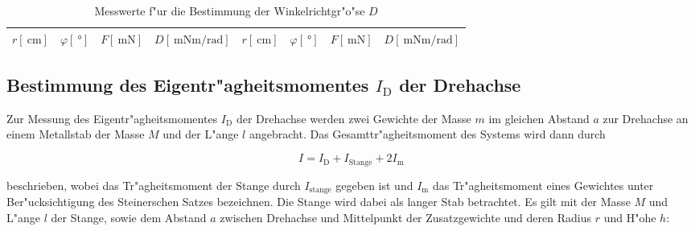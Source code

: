 
		\begin{table}[h!]
			\begin{center}
				\caption{Messwerte f"ur die Bestimmung der Winkelrichtgr"o"se $D$ \label{tabelle:winkelrichtgroesse}}
				\begin{tabular}{|c|c|c|c||c|c|c|c|}
					\hline
					$r [\SI{}{\centi \meter}]$ & $\varphi [\SI{}{\degree}]$ &  $F [\SI{}{\milli \newton}]$ & $D \left[\SI{}{\milli \newton \meter \per \radian}\right]$ & $r [\SI{}{\centi \meter}]$ & $\varphi [\SI{}{\degree}]$ &  $F [\SI{}{\milli \newton}]$ & $D \left[\SI{}{\milli \newton \meter \per \radian}\right]$\\
					\hline 
					\hline
					
					\hline 
				\end{tabular}
			\end{center}
		\end{table}

	\subsection{Bestimmung des Eigentr"agheitsmomentes $I_\mathrm{D}$ der Drehachse}
	\label{subsec:eigentraegheitsmoment}
		Zur Messung des Eigentr"agheitsmomentes $I_\mathrm{D}$ der Drehachse werden zwei Gewichte der Masse $m$ im gleichen Abstand $a$ zur Drehachse an einem Metallstab der Masse $M$ und der L"ange $l$ angebracht.
		Das Gesamttr"agheitsmoment des Systems wird dann durch

		\begin{equation}
			I = I_\mathrm{D} + I_\mathrm{Stange} + 2 I_\mathrm{m} \, \label{eqn:gesamtmoment}
		\end{equation}

		beschrieben, wobei das Tr"agheitsmoment der Stange durch $I_\mathrm{stange}$ gegeben ist und $I_\mathrm{m}$ das Tr"agheitsmoment eines Gewichtes unter Ber"ucksichtigung des Steinerschen Satzes bezeichnen. 
		Die Stange wird dabei als langer Stab betrachtet.
		Es gilt mit der Masse $M$ und L"ange $l$ der Stange, sowie dem Abstand $a$ zwischen Drehachse und Mittelpunkt der Zusatzgewichte und deren Radius $r$ und H"ohe $h$:

